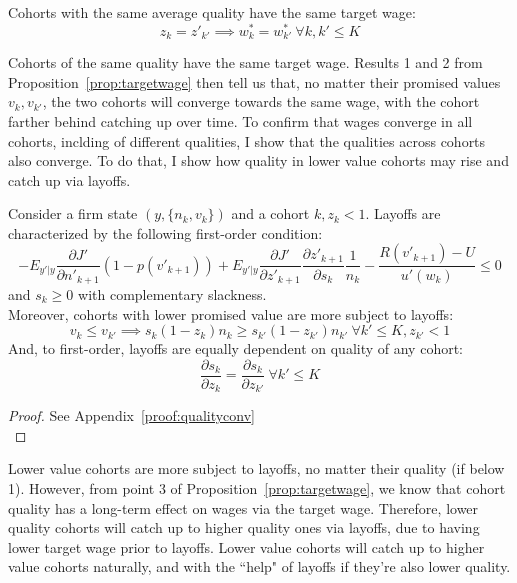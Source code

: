 \begin{corollary}
  Cohorts with the same average quality have the same target wage:
  \[z_k=z'_{k'} \implies w^*_k=w^*_{k'} \: \forall k,k'\leq K\]
\end{corollary}
Cohorts of the same quality have the same target wage. Results 1 and 2 from Proposition~\ref{prop:targetwage} then tell us that, no matter their promised values $v_k,v_{k'}$, the two cohorts will converge towards the same wage, with the cohort farther behind catching up over time. To confirm that wages converge in all cohorts, inclding of different qualities, I show that the qualities across cohorts also converge. To do that, I show how quality in lower value cohorts may rise and catch up via layoffs.

\begin{proposition} \label{prop:qualityconv}
 Consider a firm state $(y,\{n_k,v_k\})$ and a cohort $k, z_k<1$. Layoffs are characterized by the following first-order condition:
  \begin{equation}
    -E_{y'|y}\frac{\partial J'}{\partial n'_{k+1}}(1-p(v'_{k+1}))+E_{y'|y}\frac{\partial J'}{\partial z'_{k+1}}\frac{\partial z'_{k+1}}{\partial s_k}\frac{1}{n_k} - \frac{R(v'_{k+1})-U}{u'(w_k)}\leq 0
  \end{equation}
  and $s_k \geq 0$ with complementary slackness. \\
Moreover, cohorts with lower promised value are more subject to layoffs: 
    \[ v_k \leq v_{k'} \implies s_k(1- z_k) n_k \geq s_{k'}(1-z_{k'})n_{k'} \: \forall k'\leq K, z_{k'}<1\]
And, to first-order, layoffs are equally dependent on quality of any cohort:
    \[ \frac{\partial s_k}{\partial z_k} = \frac{\partial s_k}{\partial z_{k'}} \: \forall k'\leq K\]
\end{proposition}
\begin{proof}
  See Appendix~\ref{proof:qualityconv} \\

\end{proof}
Lower value cohorts are more subject to layoffs, no matter their quality (if below 1). However, from point 3 of Proposition~\ref{prop:targetwage}, we know that cohort quality has a long-term effect on wages via the target wage. Therefore, lower quality cohorts will catch up to higher quality ones via layoffs, due to having lower target wage prior to layoffs. Lower value cohorts will catch up to higher value cohorts naturally, and with the ``help" of layoffs if they're also lower quality.

